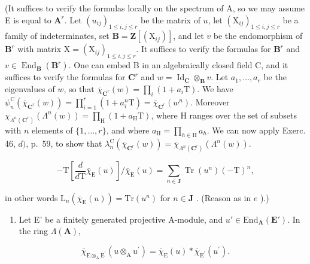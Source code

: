 (It suffices to verify the formulas locally on the spectrum of A, so we may assume E is equal to \(\mathbf{A}^r\). Let \((u_{ij})_{1\leqslant i,j\leqslant r}\) be the matrix of \(u\), let \((\mathrm{X}_{ij})_{1\leqslant i,j\leqslant r}\) be a family of indeterminates, set \(\mathbf{B} = \mathbf{Z}[(\mathrm{X}_{ij})]\), and let \(v\) be the endomorphism of \(\mathbf{B}^r\) with matrix \(\mathrm{X} = (\mathrm{X}_{ij})_{1\leqslant i,j\leqslant r}\). It suffices to verify the formulas for \(\mathbf{B}^r\) and \(v\in \operatorname {End}_{\mathbf{B}}(\mathbf{B}^r)\). One can embed B in an algebraically closed field C, and it suffices to verify the formulas for \(\mathbf{C}^r\) and \(w = \operatorname {Id}_{\mathbf{C}}\otimes_{\mathbf{B}}v\). Let \(a_1,\dots,a_r\) be the eigenvalues of \(w\), so that \(\overline{\chi}_{\mathbf{C}^r}(w) = \prod_i(1 + a_i\mathrm{T})\). We have \(\psi_n^{\mathrm{C}}(\overline{\chi}_{\mathbf{C}^r}(w)) = \prod_{i = 1}^{r}(1 + a_i^n\mathrm{T}) = \overline{\chi}_{\mathbf{C}^r}(w^n)\). Moreover \(\chi_{\Lambda^n (\mathbf{C}^r)}(\Lambda^n (w)) = \prod_{\mathrm{H}}(1 + a_{\mathrm{H}}\mathrm{T})\), where H ranges over the set of subsets with \(n\) elements of \(\{1,\dots,r\}\), and where \(a_{\mathrm{H}} = \prod_{h\in \mathrm{H}}a_h\). We can now apply Exerc. 46, \(d)\), p.~59, to show that \(\lambda_n^{\mathrm{C}}(\overline{\chi}_{\mathbf{C}^r}(w)) = \overline{\chi}_{\Lambda^{n}(\mathbf{C}^{r})}(\Lambda^{n}(w)).\)

\[
- \mathrm{T} \left[ \frac {d}{d \mathrm{T}} \overline {{{\chi}}} _ {\mathrm{E}} (u) \right] / \overline {{{\chi}}} _ {\mathrm{E}} (u) = \sum_ {n \in \mathbf {J}} \operatorname{Tr} (u ^ {n}) (- \mathrm{T}) ^ {n},
\]

in other words \(\mathrm{L}_n(\overline{\chi}_{\mathrm{E}}(u)) = \mathrm{Tr}(u^n)\) for \(n \in \mathbf{J}\) . (Reason as in \(e\) ).)

\begin{enumerate}
\def\labelenumi{\alph{enumi})}
\setcounter{enumi}{6}
\tightlist
\item
  Let E' be a finitely generated projective A-module, and \(u' \in \mathrm{End}_{\mathbf{A}}(\mathbf{E}')\). In the ring \(\Lambda(\mathbf{A})\),
\end{enumerate}

\[
\overline {{{{\chi}}}} _ {\mathrm{E} \otimes_ {\mathrm{A}} \mathrm{E} ^ {\prime}} (u \otimes_ {\mathrm{A}} u ^ {\prime}) = \overline {{{{\chi}}}} _ {\mathrm{E}} (u) * \overline {{{{\chi}}}} _ {\mathrm{E} ^ {\prime}} (u ^ {\prime}).
\]

